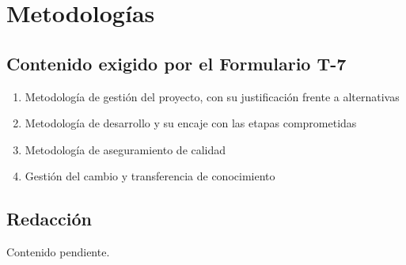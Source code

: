 \section{Metodologías}

%

\subsection{Contenido exigido por el Formulario T-7}

\begin{enumerate}
    \item Metodología de gestión del proyecto, con su justificación frente a alternativas
    \item Metodología de desarrollo y su encaje con las etapas comprometidas
    \item Metodología de aseguramiento de calidad
    \item Gestión del cambio y transferencia de conocimiento
\end{enumerate}

\subsection{Redacción}

Contenido pendiente.
